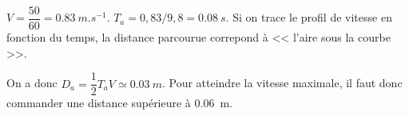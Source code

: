 \begin{corrigebox}
$V = \dfrac{50}{60} = \SI{0,83}{m.s^{-1}}$.
$T_a =0,83/9,8 = \SI{0,08}{s}$.
Si on trace le profil de vitesse en fonction du temps, la distance parcourue correpond à << l'aire sous la courbe >>. 

On a donc $D_a = \dfrac{1}{2}T_a V  \simeq \SI{0,03}{m}$.
Pour atteindre la vitesse maximale, il faut donc commander une distance supérieure à \SI{0,06}{m}.
\end{corrigebox}

